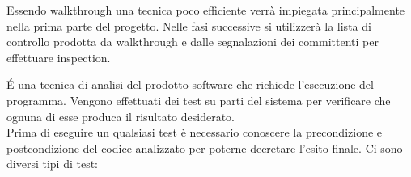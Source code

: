            Essendo walkthrough una tecnica poco efficiente verrà impiegata principalmente nella prima parte del progetto.
            Nelle fasi successive si utilizzerà la lista di controllo prodotta da walkthrough e dalle segnalazioni
            dei committenti per effettuare inspection.


            \'E una tecnica di analisi del prodotto software che richiede l'esecuzione del programma.
            Vengono	effettuati dei test su parti del sistema per verificare che ognuna di esse produca
            il risultato desiderato. \\
            Prima di eseguire un qualsiasi test è necessario conoscere la precondizione e postcondizione
            del codice analizzato per poterne decretare l'esito finale.
            Ci sono diversi tipi di test:

